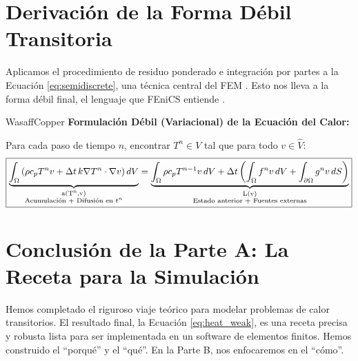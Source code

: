 \section{Derivación de la Forma Débil Transitoria}
Aplicamos el procedimiento de residuo ponderado e integración por partes a la Ecuación \ref{eq:semidiscrete}, una técnica central del FEM \cite{zienkiewicz2013}. Esto nos lleva a la forma débil final, el lenguaje que FEniCS entiende \cite{logg2012}.

\begin{keybox}{WasaffCopper}
    \textbf{Formulación Débil (Variacional) de la Ecuación del Calor:}
    
    Para cada paso de tiempo $n$, encontrar $T^n \in V$ tal que para todo $v \in \hat{V}$:
    \begin{equation}
        \boxed{
        \underbrace{\int_{\Omega} \left( \rho c_p T^n v + \Delta t \, k \nabla T^n \cdot \nabla v \right) dV}_{\substack{\text{a(T\textsuperscript{n},v)} \\ \text{Acumulación + Difusión en } t^n}} = \underbrace{\int_{\Omega} \rho c_p T^{n-1} v \, dV + \Delta t \left( \int_{\Omega} f^n v \, dV + \int_{\partial \Omega} g^n v \, dS \right)}_{\substack{\text{L(v)} \\ \text{Estado anterior + Fuentes externas}}}
        }
        \label{eq:heat_weak}
    \end{equation}
\end{keybox}

\section{Conclusión de la Parte A: La Receta para la Simulación}
Hemos completado el riguroso viaje teórico para modelar problemas de calor transitorios. El resultado final, la Ecuación \ref{eq:heat_weak}, es una receta precisa y robusta lista para ser implementada en un software de elementos finitos. Hemos construido el ``porqué'' y el ``qué''. En la Parte B, nos enfocaremos en el ``cómo''.
